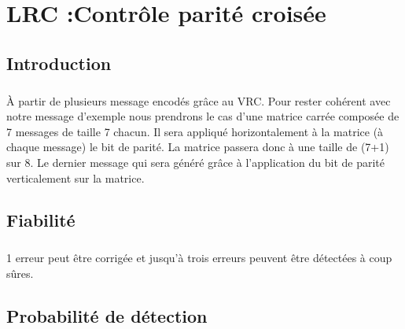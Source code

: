 
\chapter{LRC :Contrôle parité croisée}

    \section{Introduction}

        \paragraph{}
À partir de plusieurs message encodés grâce au VRC.
Pour rester cohérent avec notre message d'exemple nous prendrons le cas d'une matrice carrée composée de 7 messages de taille 7 chacun.
Il sera appliqué horizontalement à la matrice (à chaque message) le bit de parité.
La matrice passera donc à une taille de (7+1) sur 8.
Le dernier message qui sera généré grâce à l'application du bit de parité verticalement sur la matrice.


    \section{Fiabilité}

        \paragraph{}
1 erreur peut être corrigée et jusqu’à trois erreurs peuvent être détectées à coup sûres.


    \section{Probabilité de détection}

